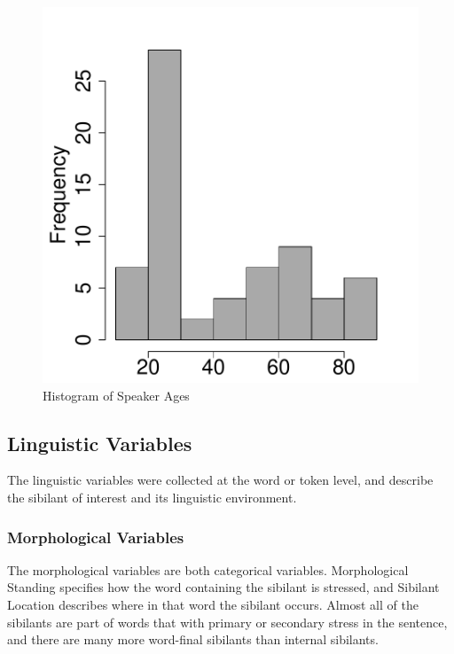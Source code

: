 \documentclass[a4paper]{article}
\begin{document}
\begin{figure}[ht]
  \begin{center}
    \begin{minipage}[t]{0.35\linewidth}\begin{center}
\includegraphics{prelim-009}
    \end{center}\end{minipage}
    \vspace{-5pt}
  \caption{Histogram of Speaker Ages}
  \label{fig:age_by_speaker}
  \end{center}
\end{figure}

\subsection*{Linguistic Variables}
The linguistic variables were collected at the word or token level,
and describe the sibilant of interest and its linguistic environment.

\subsubsection*{Morphological Variables}
The morphological variables are both categorical variables.
Morphological Standing specifies how the word containing the sibilant
is stressed, and Sibilant Location describes where in that word the
sibilant occurs.   Almost all of the
sibilants are part of words that with primary or secondary stress in
the sentence, and there are many more word-final sibilants than
internal sibilants.\vspace{-5pt}
\end{document}

